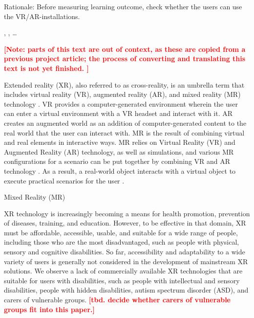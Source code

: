\documentclass[11pt,english]{nik}
\newcommand{\WVL}[1]{\textbf{\textcolor{red}{#1}}}
\begin{document}
Rationale:
Before measuring learning outcome, check whether the users can use the VR/AR-installations.

\cite{loup-escandeNeedsElaborationUsers2014}, \cite{raganEffectsFieldView2015}, \cite{10.2307/jeductechsoci.17.4.352} \dots

\WVL{[Note: parts of this text are out of context, as these are copied from a previous project article; 
the process of converting and translating this text is not yet finished. ]}

Extended reality (XR), also referred to as cross-reality, 
is an umbrella term that includes virtual reality (VR), augmented reality (AR), 
and mixed reality (MR) technology \autocite{andrews2019extended}.
VR provides a computer-generated environment wherein the user can enter a virtual environment with a 
VR headset and interact with it. 
AR creates an augmented world as an addition of computer-generated content to the real world that the user can interact with. 
MR is the result of combining virtual and real elements in interactive ways. 
MR relies on Virtual Reality (VR) and Augmented Reality (AR) technology, as well as simulations, and various MR configurations for a scenario can be put together by combining VR and AR technology \autocite{Milgram94augmentedreality}.
As a result, a real-world object interacts with a virtual object to execute practical scenarios for the user
\autocite{rokhsaritalemiReviewMixedReality2020}.

Mixed Reality (MR) 

XR technology is increasingly becoming a means for health
promotion, prevention of diseases, training, and education. 
However, to be effective in that domain, XR must be
affordable, accessible, usable, and suitable for a wide range
of people, including those who are the most disadvantaged, 
such as people with physical, sensory and cognitive disabilities.
%
So far, accessibility and adaptability to a wide variety of users is generally not considered
in the development of mainstream XR solutions. 
We observe a lack of commercially available XR technologies that are suitable
for users with disabilities, such as people
with intellectual and sensory disabilities, people with hidden disabilities, autism spectrum disorder (ASD), 
and carers of vulnerable groups. 
\WVL{[tbd. decide whether carers of vulnerable groups fit into this paper.]}
\end{document}
